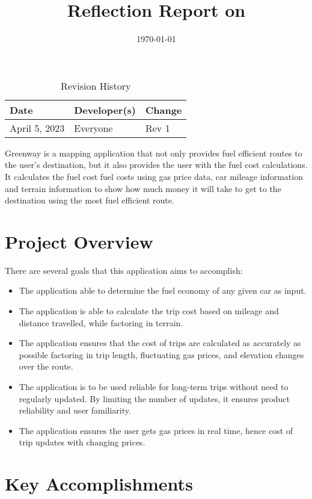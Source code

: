 \documentclass{article}
\title{Reflection Report on \progname}
\author{\authname}
\date{\today}
\begin{document}
\maketitle

\newpage

\begin{table}[hp]
\caption{Revision History} \label{TblRevisionHistory}
\begin{tabularx}{\textwidth}{llX}
\toprule
\textbf{Date} & \textbf{Developer(s)} & \textbf{Change}\\
\midrule
April 5, 2023 & Everyone & Rev 1\\
\bottomrule
\end{tabularx}
\end{table}

\newpage

Greenway is a mapping application that not only provides fuel efficient routes to the user's destination, but it also provides the user with the fuel cost calculations. It calculates the fuel cost fuel costs using gas price data, car mileage information and terrain information
to show how much money it will take to get to the destination using the most fuel efficient route.

\section{Project Overview}
There are several goals that this application aims to accomplish:
\begin{itemize}
  \item The application able to determine the fuel economy of any given car
as input.
  \item The application is able to calculate the trip cost based on mileage and distance travelled, while factoring in terrain.
  \item The application ensures that the cost of trips are calculated as accurately as possible factoring in trip length, fluctuating gas prices,
and elevation changes over the route.
  \item The application is to be used reliable for long-term trips without need to regularly updated. By limiting the number of updates, it ensures product reliability and user familiarity.
  \item The application ensures the user gets gas prices in real time, hence cost of trip updates with changing prices.
\end{itemize}

\section{Key Accomplishments}
\end{document}
